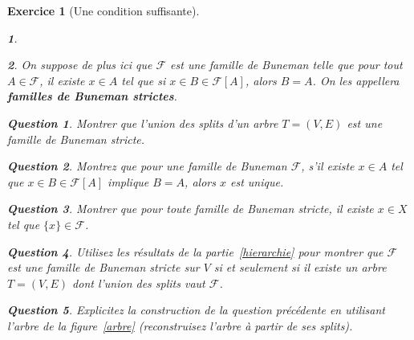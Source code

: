 \documentclass{article}
\theoremstyle{exostyle}
\newtheorem{exo}{Exercice}
\theoremstyle{partiestyle}
\newtheorem{partie}{}[exo]
\theoremstyle{questionstyle}
\newtheorem{questionpartie}{Question}[partie]
\begin{document}
\begin{exo}[Une condition suffisante]
\begin{partie}
	\end{partie}
	\begin{partie}
		\label{unique}
		On suppose de plus ici que $\mathcal{F}$ est une famille de Buneman telle que pour tout $A\in \mathcal{F}$, il existe $x \in A$ tel que si $x \in B \in \mathcal{F}[A]$, alors $B = A$. On les appellera {\bf\em familles de Buneman strictes}.
		\begin{questionpartie}
			Montrer que l'union des splits d'un arbre $T=(V, E)$ est une famille de Buneman stricte.
		\end{questionpartie}
		\begin{questionpartie}
			Montrez que pour une famille de Buneman $\mathcal{F}$, s'il existe $x \in A$ tel que $x \in B \in \mathcal{F}[A]$ implique $B = A$, alors $x$ est unique.
		\end{questionpartie}
		\begin{questionpartie}
			Montrer que pour toute famille de Buneman stricte, il existe $x \in X$ tel que $\{x \} \in \mathcal{F}$.
		\end{questionpartie}
		\begin{questionpartie}
			\label{reconstruction}
		Utilisez les résultats de la partie~\ref{hierarchie} pour montrer que $\mathcal{F}$ est une famille de Buneman stricte sur $V$ si et seulement si il existe un arbre $T=(V, E)$ dont l'union des splits vaut $\mathcal{F}$.
		\end{questionpartie}	
	\begin{questionpartie}
		Explicitez la construction de la question précédente en utilisant l'arbre de la figure~\ref{arbre} (reconstruisez l'arbre à partir de ses splits).
	\end{questionpartie}

	\end{partie}

\end{exo}
\end{document}
